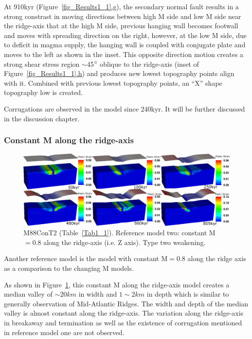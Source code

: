 At 910kyr (Figure~\hyperref[fig_Results1_1]{\ref{fig_Results1_1}.g}), the secondary normal fault results in a strong constrast in moving directions between high M side and low M side near the ridge-axis that at the high M side, previous hanging wall becomes footwall and moves with spreading direction on the right, however, at the low M side, due to deficit in magma supply, the hanging wall is coupled with conjugate plate and moves to the left as shown in the inset. This opposite direction motion creates a strong shear stress region $\sim$45$\degree$ oblique to the ridge-axis (inset of Figure~\hyperref[fig_Results1_1]{\ref{fig_Results1_1}.h}) and produces new lowest topography points align with it. Combined with previous lowest topography points, an ``X'' shape topography low is created.

Corrugations are observed in the model since 240kyr. It will be further discussed in the discussion chapter.

\subsubsection{Constant M along the ridge-axis }

\begin{figure}[h]
  \centering
    \includegraphics[width=1.0\textwidth]{./Figures/fig_Results1_3.eps}
  \caption{M88ConT2 (Table~\hyperref[Tab1_1]{\ref{Tab1_1}}). Reference model two: constant M$=0.8$ along the ridge-axis (i.e. Z axis). Type two weakening.}
 \label{fig_Results1_3}
\end{figure}   

Another reference model is the model with constant M$=0.8$ along the ridge axis as a comparison to the changing M models.

As shown in Figure~\hyperref[fig_Results1_3]{\ref{fig_Results1_3}}, this constant M along the ridge-axis model creates a median valley of $\sim 20km$ in width and $1\sim2km$ in depth which is similar to generally observation of Mid-Atlantic Ridges. The width and depth of the median valley is almost constant along the ridge-axis. The variation along the ridge-axis in breakaway and termination as well as the existence of corrugation mentioned in reference model one are not observed. 

